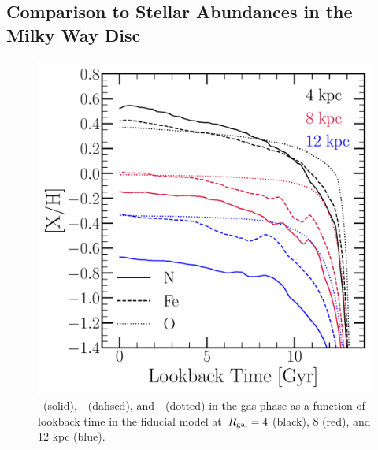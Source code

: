 \documentclass[ms.tex]{subfiles}
\begin{document}
\subsection{Comparison to Stellar Abundances in the Milky Way Disc}
\label{sec:results:vincenzo_comp}

\begin{figure}
\centering
\includegraphics[scale = 0.45]{nh_feh_vs_lookback.pdf}
\caption{
\nh~(solid),~\feh~(dahsed), and~\oh~(dotted) in the gas-phase as a function of
lookback time in the fiducial model at~$R_\text{gal} = 4$ (black), 8 (red), and 12 kpc
(blue).
}
\label{fig:nh_feh_vs_lookback}
\end{figure}
\end{document}
